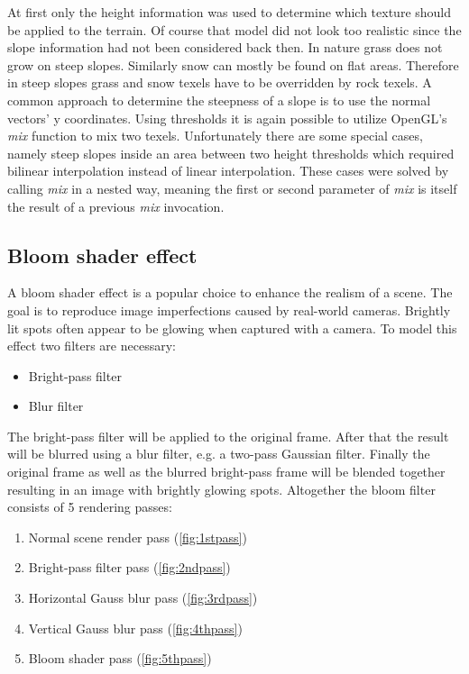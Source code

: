\documentclass[11pt,a4paper,twoside,openright]{report}
\begin{document}
At first only the height information was used to determine which texture should be applied to the terrain. Of course that model did not look too realistic since the slope information had not been considered back then. In nature grass does not grow on steep slopes. Similarly snow can mostly be found on flat areas. Therefore in steep slopes grass and snow texels have to be overridden by rock texels. A common approach to determine the steepness of a slope is to use the normal vectors' y coordinates. Using thresholds it is again possible to utilize OpenGL's \emph{mix} function to mix two texels. Unfortunately there are some special cases, namely steep slopes inside an area between two height thresholds which required bilinear interpolation instead of linear interpolation. These cases were solved by calling \emph{mix} in a nested way, meaning the first or second parameter of \emph{mix} is itself the result of a previous \emph{mix} invocation.

\subsection{Bloom shader effect}
A bloom shader effect is a popular choice to enhance the realism of a scene. The goal is to reproduce image imperfections caused by real-world cameras. Brightly lit spots often appear to be glowing when captured with a camera. To model this effect two filters are necessary:
\begin{itemize}
\item Bright-pass filter
\item Blur filter
\end{itemize}
The bright-pass filter will be applied to the original frame. After that the result will be blurred using a blur filter, e.g. a two-pass Gaussian filter. Finally the original frame as well as the blurred bright-pass frame will be blended together resulting in an image with brightly glowing spots. Altogether the bloom filter consists of 5 rendering passes:
\begin{enumerate}
  \item Normal scene render pass (\cref{fig:1stpass})
  \item Bright-pass filter pass (\cref{fig:2ndpass})
  \item Horizontal Gauss blur pass (\cref{fig:3rdpass})
  \item Vertical Gauss blur pass (\cref{fig:4thpass})
  \item Bloom shader pass (\cref{fig:5thpass})
\end{enumerate}
\end{document}
